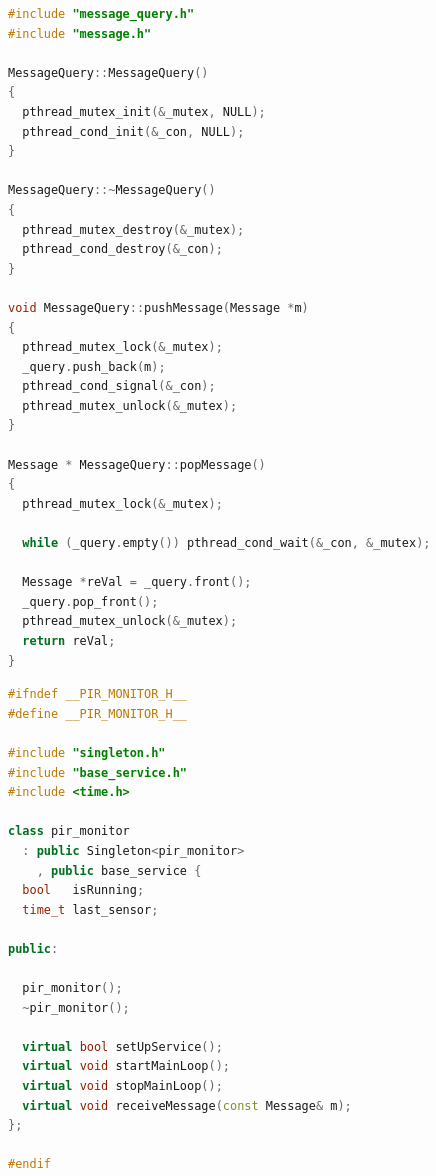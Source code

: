 \documentclass[11pt,a4paper,titlepage]{report}
\begin{document}
\begin{lstlisting}[caption=message-query.cpp,language=C++]
#include "message_query.h"
#include "message.h"

MessageQuery::MessageQuery()
{
  pthread_mutex_init(&_mutex, NULL);
  pthread_cond_init(&_con, NULL);
}

MessageQuery::~MessageQuery()
{
  pthread_mutex_destroy(&_mutex);
  pthread_cond_destroy(&_con);
}

void MessageQuery::pushMessage(Message *m)
{
  pthread_mutex_lock(&_mutex);
  _query.push_back(m);
  pthread_cond_signal(&_con);
  pthread_mutex_unlock(&_mutex);
}

Message * MessageQuery::popMessage()
{
  pthread_mutex_lock(&_mutex);

  while (_query.empty()) pthread_cond_wait(&_con, &_mutex);

  Message *reVal = _query.front();
  _query.pop_front();
  pthread_mutex_unlock(&_mutex);
  return reVal;
}
\end{lstlisting}






\begin{lstlisting}[caption=pir-monitor.h,language=C++]
#ifndef __PIR_MONITOR_H__
#define __PIR_MONITOR_H__

#include "singleton.h"
#include "base_service.h"
#include <time.h>

class pir_monitor
  : public Singleton<pir_monitor>
    , public base_service {
  bool   isRunning;
  time_t last_sensor;

public:

  pir_monitor();
  ~pir_monitor();

  virtual bool setUpService();
  virtual void startMainLoop();
  virtual void stopMainLoop();
  virtual void receiveMessage(const Message& m);
};

#endif
\end{lstlisting}
\end{document}
